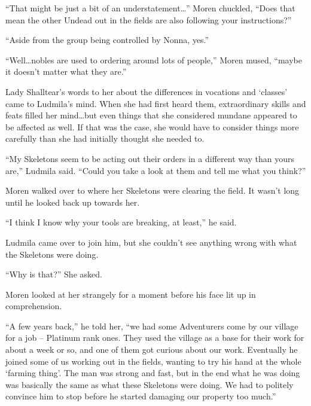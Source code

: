  

“That might be just a bit of an understatement…” Moren chuckled, “Does that mean the other Undead out in the fields are also following your instructions?”

 

“Aside from the group being controlled by Nonna, yes.”

 

“Well…nobles are used to ordering around lots of people,” Moren mused, “maybe it doesn’t matter what they are.”

 

Lady Shalltear’s words to her about the differences in vocations and ‘classes’ came to Ludmila’s mind. When she had first heard them, extraordinary skills and feats filled her mind…but even things that she considered mundane appeared to be affected as well. If that was the case, she would have to consider things more carefully than she had initially thought she needed to.

 

“My Skeletons seem to be acting out their orders in a different way than yours are,” Ludmila said. “Could you take a look at them and tell me what you think?”

 

Moren walked over to where her Skeletons were clearing the field. It wasn’t long until he looked back up towards her.

 

“I think I know why your tools are breaking, at least,” he said.

 

Ludmila came over to join him, but she couldn’t see anything wrong with what the Skeletons were doing.

 

“Why is that?” She asked.

 

Moren looked at her strangely for a moment before his face lit up in comprehension.

 

“A few years back,” he told her, “we had some Adventurers come by our village for a job – Platinum rank ones. They used the village as a base for their work for about a week or so, and one of them got curious about our work. Eventually he joined some of us working out in the fields, wanting to try his hand at the whole ‘farming thing’. The man was strong and fast, but in the end what he was doing was basically the same as what these Skeletons were doing. We had to politely convince him to stop before he started damaging our property too much.”

